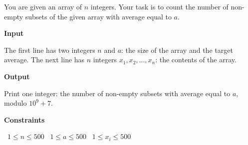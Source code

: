 You are given an array of $n$ integers. Your task is to count the number of non-empty subsets of the given array with average equal to $a$.

\vspace{0.3cm}\noindent\textbf{Input}

The first line has two integers $n$ and $a$: the size of the array and the target average.
The next line has $n$ integers $x_1, x_2,\dots, x_n$: the contents of the array.

\vspace{0.3cm}\noindent\textbf{Output}

Print one integer: the number of non-empty subsets with average equal to $a$, modulo $10^9 + 7$.

\vspace{0.3cm}\noindent\textbf{Constraints}

\textbullet\ $1 \le n \le 500$
\textbullet\ $1 \le a \le 500$
\textbullet\ $1 \le x_i \le 500$